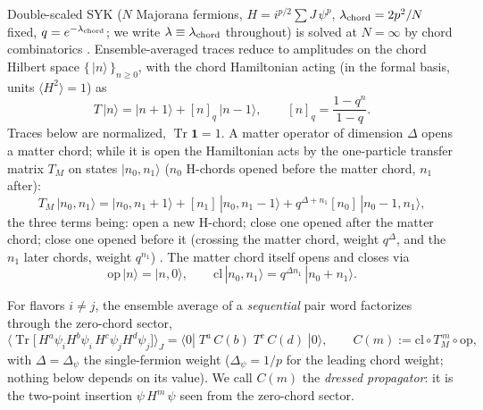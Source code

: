 \documentclass[11pt]{article}
\newcommand{\Tr}{\operatorname{Tr}}
\newcommand{\cl}{\mathrm{cl}}
\newcommand{\op}{\mathrm{op}}
\begin{document}
Double-scaled SYK ($N$ Majorana fermions, $H=i^{p/2}\sum J\,\psi^p$,
$\lambda_{\rm chord}=2p^2/N$ fixed, $q=e^{-\lambda_{\rm chord}}$; we write
$\lambda\equiv\lambda_{\rm chord}$ throughout) is solved
at $N=\infty$ by chord combinatorics \cite{BINT,BM}. Ensemble-averaged
traces reduce to amplitudes on the chord Hilbert space
$\{\,|n\rangle\,\}_{n\ge0}$, with the chord Hamiltonian acting (in the
formal basis, units $\langle H^2\rangle=1$) as
\begin{equation}
T\,|n\rangle=|n+1\rangle+[n]_q\,|n-1\rangle,
\qquad [n]_q=\frac{1-q^n}{1-q}.
\end{equation}
Traces below are normalized, $\Tr\mathbf{1}=1$. A matter operator of
dimension $\Delta$ opens a matter chord; while it is
open the Hamiltonian acts by the one-particle transfer matrix $T_M$ on
states $|n_0,n_1\rangle$ ($n_0$ H-chords opened before the matter chord,
$n_1$ after):
\begin{equation}
T_M\,|n_0,n_1\rangle=|n_0,n_1{+}1\rangle+[n_1]\,|n_0,n_1{-}1\rangle
+q^{\Delta+n_1}[n_0]\,|n_0{-}1,n_1\rangle ,
\label{eq:TM}
\end{equation}
the three terms being: open a new H-chord; close one opened after the
matter chord; close one opened before it (crossing the matter chord, weight
$q^{\Delta}$, and the $n_1$ later chords, weight $q^{n_1}$)
\cite{BINT,BM}. The matter chord itself opens and closes via
\begin{equation}
\op\,|n\rangle=|n,0\rangle,
\qquad
\cl\,|n_0,n_1\rangle=q^{\Delta n_1}\,|n_0+n_1\rangle .
\end{equation}

For flavors $i\neq j$, the ensemble average of a \emph{sequential} pair
word factorizes through the zero-chord sector,
\begin{equation}
\Big\langle\Tr\big[\,H^{a}\psi_i H^{b}\psi_i\,H^{c}\psi_j H^{d}\psi_j\big]
\Big\rangle_J
=\langle0|\;T^{a}\,C(b)\;T^{c}\,C(d)\;|0\rangle,
\qquad
C(m):=\cl\circ T_M^{\,m}\circ\op ,
\label{eq:factor}
\end{equation}
with $\Delta=\Delta_\psi$ the single-fermion weight ($\Delta_\psi=1/p$ for
the leading chord weight; nothing below depends on its value). We call
$C(m)$ the \emph{dressed propagator}: it is the two-point insertion
$\psi\,H^m\,\psi$ seen from the zero-chord sector.
\end{document}
